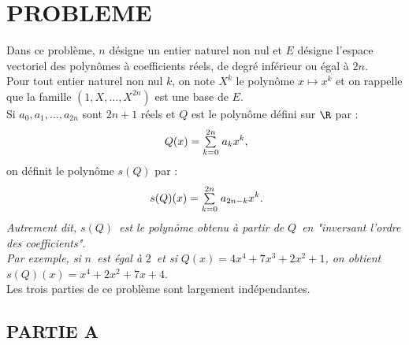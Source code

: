 \documentclass[11pt]{article}%
\begin{document}
\section*{PROBLEME}

Dans ce problème, $n$ désigne un entier naturel non nul et $E$ désigne
l'espace vectoriel des polynômes à coefficients réels, de degré
inférieur ou 
égal à $2n$. \\
Pour tout entier naturel non nul $k$, on note $X^{k}$ le polynôme
$x\mapsto
x^{k}$ et on rappelle que la famille $(1,X,\ldots,X^{2n})$ est une base
de $E$. \\
Si $a_{0},a_{1},\ldots,a_{2n}$ sont $2n + 1$ réels et $Q$ est le
polynôme défini sur $\R$ par : 
\[
\ Q(x) = {\textstyle\sum\limits_{k = 0}^{2n}}\hspace{.1cm}a_{k}x^{k},
\]
on définit le polynôme $s(Q)$ par :
\[
\ s(Q)(x) = {\textstyle\sum\limits_{k = 0}^{2n}}\hspace{.1cm}a_{2n-k}x^{k}.
\]
\textit{Autrement dit, }$s(Q)$\textit{\ est le polynôme obtenu à partir
de }$Q$\textit{\ en "inversant l'ordre des coefficients".\\
Par exemple, si }$n$\textit{\ est égal à }$2$\textit{\ et si }$Q(x) =
4x^{4} + 7x^{3} + 2x^{2} + 1$\textit{, on obtient \ }$s(Q)(x) = x^{4} +
2x^{2} + 7x + 4$.\\
Les trois parties de ce problème sont largement indépendantes.

\subsection*{PARTIE A}
\end{document}
